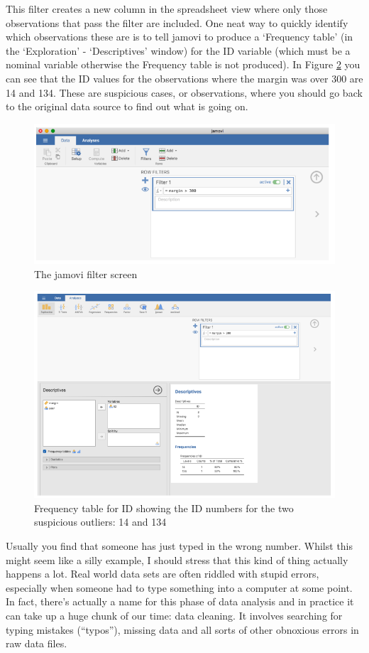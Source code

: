 \documentclass[
]{book}
\begin{document}
This filter creates a new column in the spreadsheet view where only those observations that pass the filter are included. One neat way to quickly identify which observations these are is to tell jamovi to produce a `Frequency table' (in the `Exploration' - `Descriptives' window) for the ID variable (which must be a nominal variable otherwise the Frequency table is not produced). In Figure \ref{fig:fig5-10} you can see that the ID values for the observations where the margin was over 300 are 14 and 134. These are suspicious cases, or observations, where you should go back to the original data source to find out what is going on.

\begin{figure}
\includegraphics[width=0.9\linewidth]{images/Figure30} \caption{The jamovi filter screen}\label{fig:fig5-9}
\end{figure}

\begin{figure}
\includegraphics[width=0.9\linewidth]{images/Figure31} \caption{Frequency table for ID showing the ID numbers for the two suspicious outliers: 14 and 134}\label{fig:fig5-10}
\end{figure}

Usually you find that someone has just typed in the wrong number. Whilst this might seem like a silly example, I should stress that this kind of thing actually happens a lot. Real world data sets are often riddled with stupid errors, especially when someone had to type something into a computer at some point. In fact, there's actually a name for this phase of data analysis and in practice it can take up a huge chunk of our time: data cleaning. It involves searching for typing mistakes (``typos''), missing data and all sorts of other obnoxious errors in raw data files.
\end{document}

